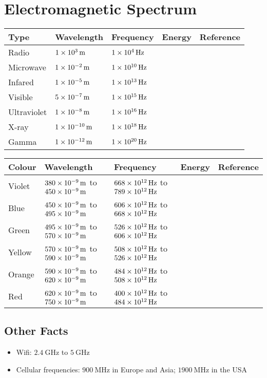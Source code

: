 \documentclass{article}
\begin{document}
\section{Electromagnetic Spectrum}
\begin{table}[H]
	\centering
	\begin{tabularx}{0.75\textwidth}{ X X X X X }
		Type & Wavelength & Frequency & Energy & Reference \\
		\hline
		Radio & $\SI{1E3}{\m}$ & $\SI{1E4}{\hertz}$ & & \\
		Microwave & $\SI{1E-2}{\m}$ & $\SI{1E10}{\hertz}$ & & \\
		Infared & $\SI{1E-5}{\m}$ & $\SI{1E13}{\hertz}$ & & \\
		Visible & $\SI{5E-7}{\m}$ & $\SI{1E15}{\hertz}$ & & \\
		Ultraviolet & $\SI{1E-8}{\m}$ & $\SI{1E16}{\hertz}$ & & \\
		X-ray & $\SI{1E-10}{\m}$ & $\SI{1E18}{\hertz}$ & & \\
		Gamma & $\SI{1E-12}{\m}$ & $\SI{1E20}{\hertz}$ & & \\
	\end{tabularx}
\end{table}
\begin{table}[H]
	\centering
	\begin{tabularx}{\textwidth}{ X X X X X }
		Colour & Wavelength & Frequency & Energy & Reference \\
		\hline
		Violet & $\SI{380E-9}{\m}$ to $\SI{450E-9}{\m}$ & $\SI{668E12}{\hertz}$ to $\SI{789E12}{\hertz}$ & & \\
		Blue & $\SI{450E-9}{\m}$ to $\SI{495E-9}{\m}$ & $\SI{606E12}{\hertz}$ to $\SI{668E12}{\hertz}$ & & \\
		Green & $\SI{495E-9}{\m}$ to $\SI{570E-9}{\m}$ & $\SI{526E12}{\hertz}$ to $\SI{606E12}{\hertz}$ & & \\
		Yellow & $\SI{570E-9}{\m}$ to $\SI{590E-9}{\m}$ & $\SI{508E12}{\hertz}$ to $\SI{526E12}{\hertz}$ & & \\
		Orange & $\SI{590E-9}{\m}$ to $\SI{620E-9}{\m}$ & $\SI{484E12}{\hertz}$ to $\SI{508E12}{\hertz}$ & & \\
		Red & $\SI{620E-9}{\m}$ to $\SI{750E-9}{\m}$ & $\SI{400E12}{\hertz}$ to $\SI{484E12}{\hertz}$ & & \\
	\end{tabularx}
\end{table}
\subsection{Other Facts}
	\begin{itemize}
		\item Wifi: $\SI{2.4}{\giga\hertz}$ to $\SI{5}{\giga\hertz}$
		\item Cellular frequencies: $\SI{900}{\mega\hertz}$ in Europe and Asia; $\SI{1900}{\mega\hertz}$ in the USA
	\end{itemize}
\end{document}
